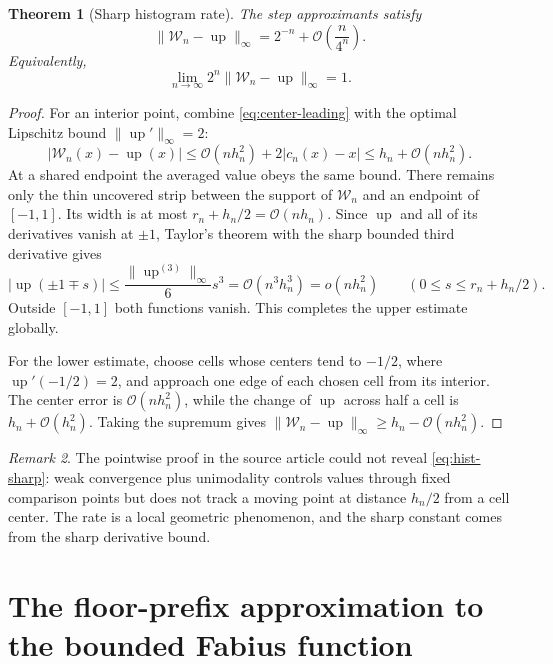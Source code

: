 \documentclass[11pt,oneside]{article}
\newtheorem{theorem}{Theorem}[section]
\theoremstyle{definition}
\theoremstyle{remark}
\newtheorem{remark}[theorem]{Remark}
\newcommand{\Up}{\operatorname{up}}
\newcommand{\bigO}{\mathcal O}
\newcommand{\smallo}{o}
\begin{document}
\begin{theorem}[Sharp histogram rate]
\label{thm:hist-sharp}
The step approximants satisfy
\begin{equation}
 \|\mathcal W_n-\Up\|_\infty
 =2^{-n}+\bigO\!\left(\frac n{4^n}\right).                \label{eq:hist-sharp}
\end{equation}
Equivalently,
\begin{equation}
 \lim_{n\to\infty}2^n\|\mathcal W_n-\Up\|_\infty=1.      \label{eq:hist-limit-constant}
\end{equation}
\end{theorem}

\begin{proof}
For an interior point, combine \eqref{eq:center-leading} with the optimal Lipschitz bound
$\|\Up'\|_\infty=2$:
\[
 |\mathcal W_n(x)-\Up(x)|
 \le \bigO(nh_n^2)+2|c_n(x)-x|
 \le h_n+\bigO(nh_n^2).
\]
At a shared endpoint the averaged value obeys the same bound.  There remains only the thin
uncovered strip between the support of $\mathcal W_n$ and an endpoint of $[-1,1]$.
Its width is at most $r_n+h_n/2=\bigO(nh_n)$.  Since $\Up$ and all of its
derivatives vanish at $\pm1$, Taylor's theorem with the sharp bounded third derivative gives
\[
 |\Up(\pm1\mp s)|\le \frac{\|\Up^{(3)}\|_\infty}{6}s^3
 =\bigO(n^3h_n^3)=\smallo(nh_n^2)
 \qquad(0\le s\le r_n+h_n/2).
\]
Outside $[-1,1]$ both functions vanish.  This completes the upper estimate globally.

For the lower estimate, choose cells whose centers tend to $-1/2$, where
$\Up'(-1/2)=2$, and approach one edge of each chosen cell from its interior.  The center error
is $\bigO(nh_n^2)$, while the change of $\Up$ across half a cell is
$h_n+\bigO(h_n^2)$.  Taking the supremum gives
$\|\mathcal W_n-\Up\|_\infty\ge h_n-\bigO(nh_n^2)$.
\end{proof}

\begin{remark}
The pointwise proof in the source article could not reveal \eqref{eq:hist-sharp}: weak
convergence plus unimodality controls values through fixed comparison points but does not
track a moving point at distance $h_n/2$ from a cell center.  The rate is a local geometric
phenomenon, and the sharp constant comes from the sharp derivative bound.
\end{remark}

\section{The floor-prefix approximation to the bounded Fabius function}
\label{sec:floor-rate}
\end{document}
